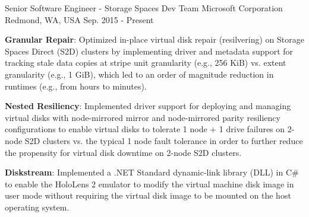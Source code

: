 

\begin{cventries}

  \cventry
    {Senior Software Engineer - Storage Spaces Dev Team} %
    {Microsoft Corporation} %
    {Redmond, WA, USA} %
    {Sep. 2015 - Present} %
    {
      \begin{cvitems} %
        \item {
          \textbf{Granular Repair}: Optimized in-place virtual disk repair (resilvering) on Storage
          Spaces Direct (S2D) clusters by implementing driver and metadata support for tracking
          stale data copies at stripe unit granularity (e.g., 256 KiB) vs. extent granularity
          (e.g., 1 GiB), which led to an order of magnitude reduction in runtimes (e.g., from hours
          to minutes).
        }
        \item {
          \textbf{Nested Resiliency}: Implemented driver support for deploying and managing virtual
          disks with node-mirrored mirror and node-mirrored parity resiliency configurations to
          enable virtual disks to tolerate 1 node + 1 drive failures on 2-node S2D clusters vs. the
          typical 1 node fault tolerance in order to further reduce the propensity for virtual disk
          downtime on 2-node S2D clusters.
        }
        \item {
          \textbf{Diskstream}: Implemented a .NET Standard dynamic-link library (DLL) in C\# to
          enable the HoloLens 2 emulator to modify the virtual machine disk image in user mode
          without requiring the virtual disk image to be mounted on the host operating system.
        }
      \end{cvitems}
    }


\end{cventries}
